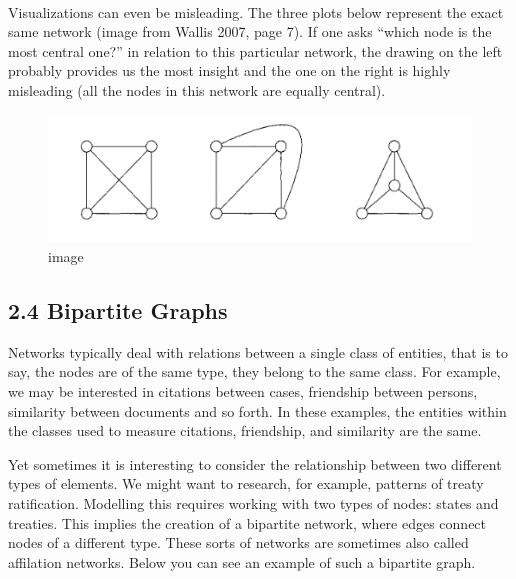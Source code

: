     \begin{center}
    \end{center}
    { \hspace*{\fill} \\}
    
    Visualizations can even be misleading. The three plots below represent
the exact same network (image from Wallis 2007, page 7). If one asks
``which node is the most central one?'' in relation to this particular
network, the drawing on the left probably provides us the most insight
and the one on the right is highly misleading (all the nodes in this
network are equally central).

\begin{figure}
\centering
\includegraphics{images/ch1/equivalent_viz.png}
\caption{image}
\end{figure}

    \hypertarget{bipartite-graphs}{%
\subsection{2.4 Bipartite Graphs}\label{bipartite-graphs}}

Networks typically deal with relations between a single class of
entities, that is to say, the nodes are of the same type, they belong to
the same class. For example, we may be interested in citations between
cases, friendship between persons, similarity between documents and so
forth. In these examples, the entities within the classes used to
measure citations, friendship, and similarity are the same.

Yet sometimes it is interesting to consider the relationship between two
different types of elements. We might want to research, for example,
patterns of treaty ratification. Modelling this requires working with
two types of nodes: states and treaties. This implies the creation of a
bipartite network, where edges connect nodes of a different type. These
sorts of networks are sometimes also called affilation networks. Below
you can see an example of such a bipartite graph.

